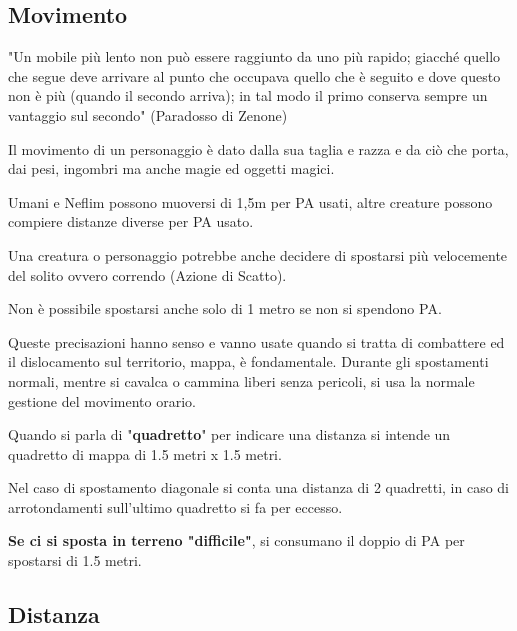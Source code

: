 \documentclass[12pt,a4paper,twoside,openany]{book}
\begin{document}
\subsection{Movimento}\label{movimento}


\begin{changemargin}{0.3cm}{0.3cm}\begin{enfasi}{"Un mobile più lento non può essere raggiunto da uno più rapido; giacché quello che segue deve arrivare al punto che occupava quello che è seguito e dove questo non è più (quando il secondo arriva); in tal modo il primo conserva sempre un vantaggio sul secondo" (Paradosso di Zenone)}
\end{enfasi}\end{changemargin}

\begin{multicols}{2}

Il movimento di un personaggio è dato dalla sua taglia e razza e da ciò che porta, dai pesi, ingombri ma anche magie ed oggetti magici.

Umani e Neflim possono muoversi di 1,5m per PA usati, altre creature possono compiere distanze diverse per PA usato.

Una creatura o personaggio potrebbe anche decidere di spostarsi più velocemente del solito ovvero correndo (Azione di Scatto).

Non è possibile spostarsi anche solo di 1 metro se non si spendono PA.

Queste precisazioni hanno senso e vanno usate quando si tratta di combattere ed il dislocamento sul territorio, mappa, è fondamentale. Durante gli spostamenti normali, mentre si cavalca o cammina liberi senza pericoli, si usa la normale gestione del movimento orario.

Quando si parla di "\textbf{quadretto}" per indicare una distanza si intende un quadretto di mappa di 1.5 metri x 1.5 metri.

Nel caso di spostamento diagonale si conta una distanza di 2 quadretti, in caso di arrotondamenti sull'ultimo quadretto si fa per eccesso.

\textbf{Se ci si sposta in terreno "difficile"}, si consumano il doppio di PA per spostarsi di 1.5 metri.

\subsection{Distanza}\label{distanza}


\end{multicols}
\end{document}
